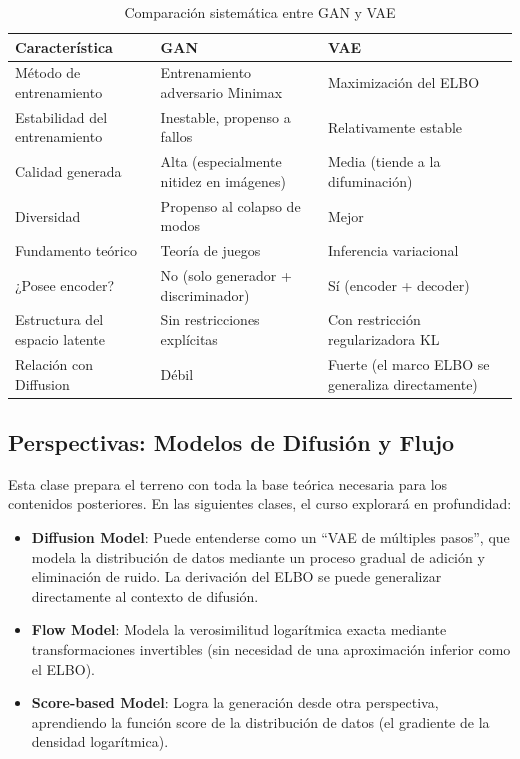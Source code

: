 \begin{table}[H]
\centering
\begin{tabular}{lll}
\toprule
Característica & GAN & VAE \\
\midrule
Método de entrenamiento & Entrenamiento adversario Minimax & Maximización del ELBO \\
Estabilidad del entrenamiento & Inestable, propenso a fallos & Relativamente estable \\
Calidad generada & Alta (especialmente nitidez en imágenes) & Media (tiende a la difuminación) \\
Diversidad & Propenso al colapso de modos & Mejor \\
Fundamento teórico & Teoría de juegos & Inferencia variacional \\
¿Posee encoder? & No (solo generador + discriminador) & Sí (encoder + decoder) \\
Estructura del espacio latente & Sin restricciones explícitas & Con restricción regularizadora KL \\
Relación con Diffusion & Débil & Fuerte (el marco ELBO se generaliza directamente) \\
\bottomrule
\end{tabular}
\caption{Comparación sistemática entre GAN y VAE}
\end{table}

\subsection{Perspectivas: Modelos de Difusión y Flujo}

Esta clase prepara el terreno con toda la base teórica necesaria para los contenidos posteriores. En las siguientes clases, el curso explorará en profundidad:

\begin{itemize}
    \item \textbf{Diffusion Model}: Puede entenderse como un ``VAE de múltiples pasos'', que modela la distribución de datos mediante un proceso gradual de adición y eliminación de ruido. La derivación del ELBO se puede generalizar directamente al contexto de difusión.
    \item \textbf{Flow Model}: Modela la verosimilitud logarítmica exacta mediante transformaciones invertibles (sin necesidad de una aproximación inferior como el ELBO).
    \item \textbf{Score-based Model}: Logra la generación desde otra perspectiva, aprendiendo la función score de la distribución de datos (el gradiente de la densidad logarítmica).
\end{itemize}

